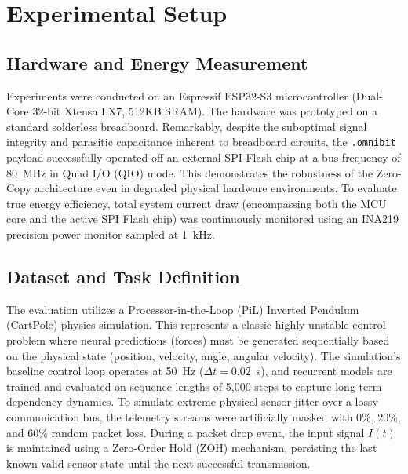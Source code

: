\documentclass[conference]{IEEEtran}
\begin{document}
\section{Experimental Setup}

\subsection{Hardware and Energy Measurement}
Experiments were conducted on an Espressif ESP32-S3 microcontroller (Dual-Core 32-bit Xtensa LX7, 512KB SRAM). The hardware was prototyped on a standard solderless breadboard. Remarkably, despite the suboptimal signal integrity and parasitic capacitance inherent to breadboard circuits, the \texttt{.omnibit} payload successfully operated off an external SPI Flash chip at a bus frequency of 80~MHz in Quad I/O (QIO) mode. This demonstrates the robustness of the Zero-Copy architecture even in degraded physical hardware environments. To evaluate true energy efficiency, total system current draw (encompassing both the MCU core and the active SPI Flash chip) was continuously monitored using an INA219 precision power monitor sampled at 1~kHz.

\subsection{Dataset and Task Definition}
The evaluation utilizes a Processor-in-the-Loop (PiL) Inverted Pendulum (CartPole) physics simulation. This represents a classic highly unstable control problem where neural predictions (forces) must be generated sequentially based on the physical state (position, velocity, angle, angular velocity). The simulation's baseline control loop operates at 50~Hz ($\Delta t = 0.02$~s), and recurrent models are trained and evaluated on sequence lengths of 5,000 steps to capture long-term dependency dynamics. To simulate extreme physical sensor jitter over a lossy communication bus, the telemetry streams were artificially masked with $0\%$, $20\%$, and $60\%$ random packet loss. During a packet drop event, the input signal $I(t)$ is maintained using a Zero-Order Hold (ZOH) mechanism, persisting the last known valid sensor state until the next successful transmission.
\end{document}
